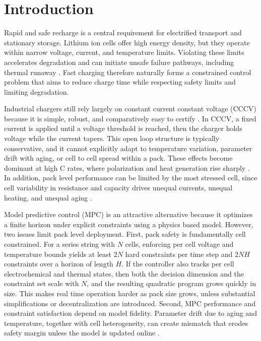 \documentclass[%
 aip,
 amsmath,amssymb,
reprint, onecolumn %
]{revtex4-1}
\begin{document}
\maketitle

\section{\label{sec_introduction}Introduction}

Rapid and safe recharge is a central requirement for electrified transport and stationary storage. Lithium ion cells offer high energy density, but they operate within narrow voltage, current, and temperature limits. Violating these limits accelerates degradation and can initiate unsafe failure pathways, including thermal runaway \cite{hu2020,tomaszewska2019}. Fast charging therefore naturally forms a constrained control problem that aims to reduce charge time while respecting safety limits and limiting degradation.

Industrial chargers still rely largely on constant current constant voltage (CCCV) because it is simple, robust, and comparatively easy to certify \cite{tomaszewska2019}. In CCCV, a fixed current is applied until a voltage threshold is reached, then the charger holds voltage while the current tapers. This open loop structure is typically conservative, and it cannot explicitly adapt to temperature variation, parameter drift with aging, or cell to cell spread within a pack. These effects become dominant at high C rates, where polarization and heat generation rise sharply \cite{tanim2018}. In addition, pack level performance can be limited by the most stressed cell, since cell variability in resistance and capacity drives unequal currents, unequal heating, and unequal aging \cite{xin2024machines}.

Model predictive control (MPC) is an attractive alternative because it optimizes a finite horizon under explicit constraints using a physics based model. However, two issues limit pack level deployment. First, pack safety is fundamentally cell constrained. For a series string with $N$ cells, enforcing per cell voltage and temperature bounds yields at least $2N$ hard constraints per time step and $2NH$ constraints over a horizon of length $H$. If the controller also tracks per cell electrochemical and thermal states, then both the decision dimension and the constraint set scale with $N$, and the resulting quadratic program grows quickly in size. This makes real time operation harder as pack size grows, unless substantial simplifications or decentralization are introduced. Second, MPC performance and constraint satisfaction depend on model fidelity. Parameter drift due to aging and temperature, together with cell heterogeneity, can create mismatch that erodes safety margin unless the model is updated online \cite{liu2018}.
\end{document}
